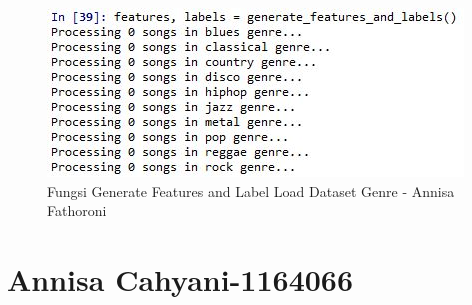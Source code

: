 \begin{enumerate}
\begin{itemize}
\begin{figure}[!hbtp]
\centering
\includegraphics[scale=0.7]{figures/Chapter6AnnisaFathoroni18.jpg}
\caption{Fungsi Generate Features and Label Load Dataset Genre - Annisa Fathoroni}
\label{Fungsi Generate Features and Label Load Dataset Genre - Annisa Fathoroni}
\end{figure}

\end{itemize}

\end{enumerate}

\section{Annisa Cahyani-1164066}
